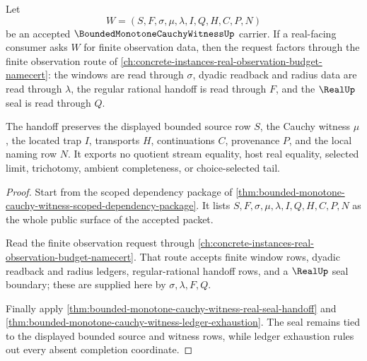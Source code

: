 \begin{theorem}
\label{thm:bounded-monotone-cauchy-witness-real-observation-budget-handoff}
Let
$$
W=(S,F,\sigma,\mu,\lambda,I,Q,H,C,P,N)
$$
be an accepted $\BoundedMonotoneCauchyWitnessUp$ carrier. If a real-facing consumer asks $W$ for finite observation data, then the request factors through the finite observation route of \autoref{ch:concrete-instances-real-observation-budget-namecert}: the windows are read through $\sigma$, dyadic readback and radius data are read through $\lambda$, the regular rational handoff is read through $F$, and the $\RealUp$ seal is read through $Q$.

The handoff preserves the displayed bounded source row $S$, the Cauchy witness $\mu$, the located trap $I$, transports $H$, continuations $C$, provenance $P$, and the local naming row $N$. It exports no quotient stream equality, host real equality, selected limit, trichotomy, ambient completeness, or choice-selected tail.
\end{theorem}
\begin{proof}
Start from the scoped dependency package of \autoref{thm:bounded-monotone-cauchy-witness-scoped-dependency-package}. It lists $S,F,\sigma,\mu,\lambda,I,Q,H,C,P,N$ as the whole public surface of the accepted packet.

Read the finite observation request through \autoref{ch:concrete-instances-real-observation-budget-namecert}. That route accepts finite window rows, dyadic readback and radius ledgers, regular-rational handoff rows, and a $\RealUp$ seal boundary; these are supplied here by $\sigma,\lambda,F,Q$.

Finally apply \autoref{thm:bounded-monotone-cauchy-witness-real-seal-handoff} and \autoref{thm:bounded-monotone-cauchy-witness-ledger-exhaustion}. The seal remains tied to the displayed bounded source and witness rows, while ledger exhaustion rules out every absent completion coordinate.
\end{proof}


